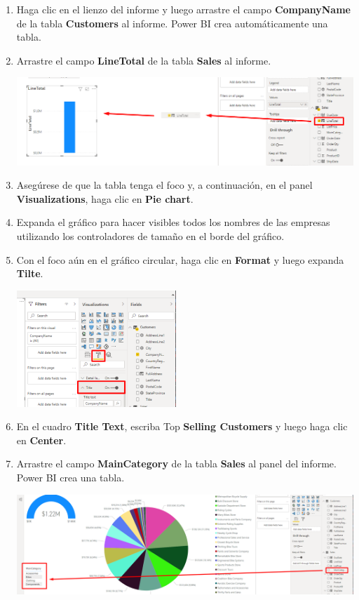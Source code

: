 \documentclass[12pt,letterpaper]{article}
\newcommand\tab[1][1cm]{\hspace*{#1}}
\begin{document}
\begin{enumerate}[\tab 1.]
        \item Haga clic en el lienzo del informe y luego arrastre el campo \textbf{CompanyName} de la tabla \textbf{Customers} al informe. Power BI crea automáticamente una tabla.
        \item Arrastre el campo \textbf{LineTotal} de la tabla \textbf{Sales} al informe.
        \begin{center}
            \includegraphics[width=13cm]{./img/img84.png}
        \end{center}
        \item Asegúrese de que la tabla tenga el foco y, a continuación, en el panel \textbf{Visualizations}, haga clic en \textbf{Pie chart}.
        \item Expanda el gráfico para hacer visibles todos los nombres de las empresas utilizando los controladores de tamaño en el borde del gráfico.
        \item Con el foco aún en el gráfico circular, haga clic en \textbf{Format} y luego expanda \textbf{Tilte}.
        \begin{center}
            \includegraphics[width=6cm]{./img/img87.png}
        \end{center}
        \item En el cuadro \textbf{Title Text}, escriba Top \textbf{Selling Customers} y luego haga clic en \textbf{Center}.
        \item Arrastre el campo \textbf{MainCategory} de la tabla \textbf{Sales} al panel del informe. Power BI crea una tabla.
        \begin{center}
            \includegraphics[width=13cm]{./img/img89.png}

\end{center}
\end{enumerate}
\end{document}
